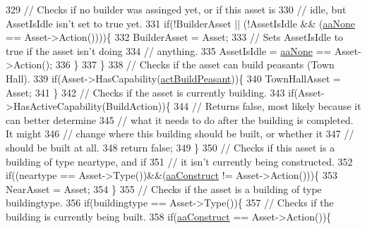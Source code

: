 \begin{DoxyCode}
329                 \textcolor{comment}{// Checks if no builder was assinged yet, or if this asset is}
330                 \textcolor{comment}{// idle, but AssetIsIdle isn't set to true yet.}
331                 \textcolor{keywordflow}{if}(!BuilderAsset || (!AssetIsIdle && (\hyperlink{GameDataTypes_8h_ab47668e651a3032cfb9c40ea2d60d670ac17cc5a0035320c060d7f8074143b507}{aaNone} == Asset->Action())))\{
332                     BuilderAsset = Asset;
333                     \textcolor{comment}{// Sets AssetIsIdle to true if the asset isn't doing }
334                     \textcolor{comment}{// anything.}
335                     AssetIsIdle = \hyperlink{GameDataTypes_8h_ab47668e651a3032cfb9c40ea2d60d670ac17cc5a0035320c060d7f8074143b507}{aaNone} == Asset->Action();
336                 \}
337             \}
338             \textcolor{comment}{// Checks if the asset can build peasants (Town Hall).}
339             \textcolor{keywordflow}{if}(Asset->HasCapability(\hyperlink{GameDataTypes_8h_a35b98ce26aca678b03c6f9f76e4778cea66c601dce0fc095460b3c2c25f66ee71}{actBuildPeasant}))\{
340                 TownHallAsset = Asset;
341             \}
342             \textcolor{comment}{// Checks if the asset is currently building.}
343             \textcolor{keywordflow}{if}(Asset->HasActiveCapability(BuildAction))\{
344                 \textcolor{comment}{// Returns false, most likely because it can better determine }
345                 \textcolor{comment}{// what it needs to do after the building is completed. It might}
346                 \textcolor{comment}{// change where this building should be built, or whether it }
347                 \textcolor{comment}{// should be built at all.}
348                 \textcolor{keywordflow}{return} \textcolor{keyword}{false};    
349             \}
350             \textcolor{comment}{// Checks if this asset is a building of type neartype, and if }
351             \textcolor{comment}{// it isn't currently being constructed.}
352             \textcolor{keywordflow}{if}((neartype == Asset->Type())&&(\hyperlink{GameDataTypes_8h_ab47668e651a3032cfb9c40ea2d60d670a7ef6b863f66dd7dcc95a199cd758ae1d}{aaConstruct} != Asset->Action()))\{
353                 NearAsset = Asset;
354             \}
355             \textcolor{comment}{// Checks if the asset is a building of type buildingtype.}
356             \textcolor{keywordflow}{if}(buildingtype == Asset->Type())\{
357                 \textcolor{comment}{// Checks if the building is currently being built.}
358                 \textcolor{keywordflow}{if}(\hyperlink{GameDataTypes_8h_ab47668e651a3032cfb9c40ea2d60d670a7ef6b863f66dd7dcc95a199cd758ae1d}{aaConstruct} == Asset->Action())\{

\end{DoxyCode}
